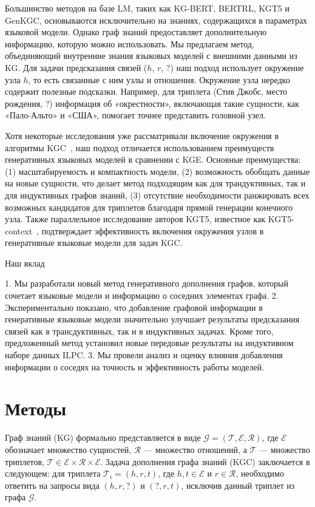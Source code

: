 Большинство методов на базе LM, таких как KG-BERT, BERTRL, KGT5 и GenKGC, основываются исключительно на знаниях, содержащихся в параметрах языковой модели. Однако граф знаний предоставляет дополнительную информацию, которую можно использовать. Мы предлагаем метод, объединяющий внутренние знания языковых моделей с внешними данными из KG. Для задачи предсказания связей ($h$, $r$, $?$) наш подход использует окружение узла $h$, то есть связанные с ним узлы и отношения. Окружение узла нередко содержит полезные подсказки. Например, для триплета (Стив Джобс, место рождения, ?) информация об «окрестности», включающая такие сущности, как «Пало-Альто» и «США», помогает точнее представить головной узел.

Хотя некоторые исследования уже рассматривали включение окружения в алгоритмы KGC~\cite{chen2020hitter}, наш подход отличается использованием преимуществ генеративных языковых моделей в сравнении с KGE. Основные преимущества: (1) масштабируемость и компактность модели, (2) возможность обобщать данные на новые сущности, что делает метод подходящим как для трандуктивных, так и для индуктивных графов знаний, (3) отсутствие необходимости ранжировать всех возможных кандидатов для триплетов благодаря прямой генерации конечного узла. Также параллельное исследование авторов KGT5, известное как KGT5-context~\cite{kochsiek2023friendly}, подтверждает эффективность включения окружения узлов в генеративные языковые модели для задач KGC.


Наш вклад

1. Мы разработали новый метод генеративного дополнения графов, который сочетает языковые модели и информацию о соседних элементах графа.  
2. Экспериментально показано, что добавление графовой информации в генеративные языковые модели значительно улучшает результаты предсказания связей как в трансдуктивных, так и в индуктивных задачах. Кроме того, предложенный метод установил новые передовые результаты на индуктивном наборе данных ILPC.  
3. Мы провели анализ и оценку влияния добавления информации о соседях на точность и эффективность работы моделей.  


\section{Методы}

Граф знаний (KG) формально представляется в виде \(\mathcal{G} = (\mathcal{T}, \mathcal{E}, \mathcal{R})\), где \(\mathcal{E}\) обозначает множество сущностей, \(\mathcal{R}\) — множество отношений, а \(\mathcal{T}\) — множество триплетов, \(\mathcal{T} \in \mathcal{E} \times \mathcal{R} \times \mathcal{E}\). Задача дополнения графа знаний (KGC) заключается в следующем: для триплета \(\mathcal{T}_{i} = (h, r, t)\), где \(h, t \in \mathcal{E}\) и \(r \in \mathcal{R}\), необходимо ответить на запросы вида \((h, r, ?)\) и \((?, r, t)\), исключив данный триплет из графа \(\mathcal{G}\).

